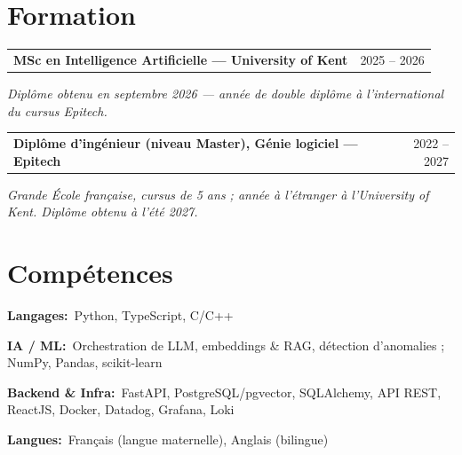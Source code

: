 \documentclass[10pt,a4paper]{article}
\makeatletter
\newcommand{\entry}[2]{%
  \vspace{1pt}\noindent\begin{tabular*}{\textwidth}{@{}l@{\extracolsep{\fill}}r@{}}
  \textbf{#1} & #2 \\
  \end{tabular*}\par}
\newcommand{\subentry}[1]{\noindent\textit{#1}\par\vspace{1pt}}
\newcommand{\skillrow}[2]{\noindent\textbf{#1:}~#2\par}
\makeatother
\begin{document}
\section{Formation}

\entry{MSc en Intelligence Artificielle --- University of Kent}{2025 -- 2026}
\subentry{Diplôme obtenu en septembre 2026 --- année de double diplôme à l'international du cursus Epitech.}

\entry{Diplôme d'ingénieur (niveau Master), Génie logiciel --- Epitech}{2022 -- 2027}
\subentry{Grande École française, cursus de 5 ans ; année à l'étranger à l'University of Kent. Diplôme obtenu à l'été 2027.}

\section{Compétences}
\skillrow{Langages}{Python, TypeScript, C/C++}
\skillrow{IA / ML}{Orchestration de LLM, embeddings \& RAG, détection d'anomalies ; NumPy, Pandas, scikit-learn}
\skillrow{Backend \& Infra}{FastAPI, PostgreSQL/pgvector, SQLAlchemy, API REST, ReactJS, Docker, Datadog, Grafana, Loki}
\skillrow{Langues}{Français (langue maternelle), Anglais (bilingue)}
\end{document}
